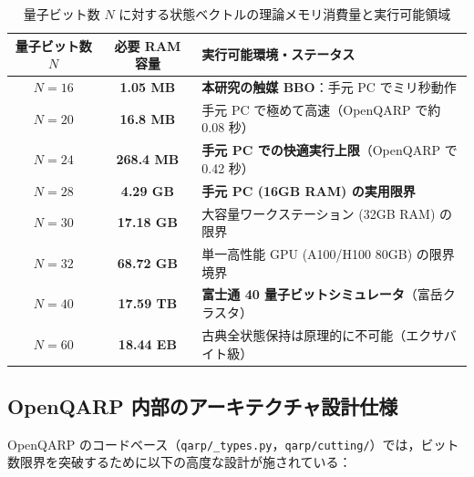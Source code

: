 \documentclass[11pt,a4paper]{ltjsarticle}
\begin{document}
\begin{table}[H]
\centering
\small
\caption{量子ビット数 $N$ に対する状態ベクトルの理論メモリ消費量と実行可能領域}
\label{tab:ram_scaling}
\vspace{1mm}
\begin{tabular}{ccl}
\toprule
\textbf{量子ビット数 $N$} & \textbf{必要 RAM 容量} & \textbf{実行可能環境・ステータス} \\
\midrule
$N = 16$ & \textbf{1.05 MB} & \textbf{本研究の触媒 BBO}：手元 PC でミリ秒動作 \\
$N = 20$ & \textbf{16.8 MB} & 手元 PC で極めて高速（OpenQARP で約 0.08 秒） \\
$N = 24$ & \textbf{268.4 MB} & \textbf{手元 PC での快適実行上限}（OpenQARP で 0.42 秒） \\
$N = 28$ & \textbf{4.29 GB} & \textbf{手元 PC (16GB RAM) の実用限界} \\
$N = 30$ & \textbf{17.18 GB} & 大容量ワークステーション (32GB RAM) の限界 \\
$N = 32$ & \textbf{68.72 GB} & 単一高性能 GPU (A100/H100 80GB) の限界境界 \\
$N = 40$ & \textbf{17.59 TB} & \textbf{富士通 40 量子ビットシミュレータ}（富岳クラスタ） \\
$N = 60$ & \textbf{18.44 EB} & 古典全状態保持は原理的に不可能（エクサバイト級） \\
\bottomrule
\end{tabular}
\end{table}

\subsection{OpenQARP 内部のアーキテクチャ設計仕様}
OpenQARP のコードベース（\texttt{qarp/\_types.py}，\texttt{qarp/cutting/}）では，ビット数限界を突破するために以下の高度な設計が施されている：
\end{document}
